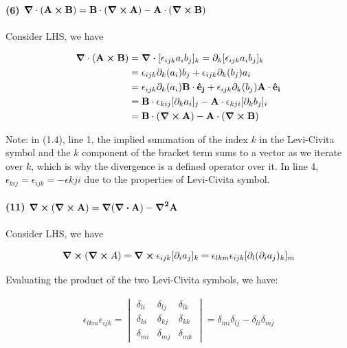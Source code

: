 \documentclass{article}
\numberwithin{equation}{section}
\begin{document}
\paragraph{(6) $\vb{\grad \cdot (A \cross B) = B \cdot (\grad \cross A) - A \cdot (\grad \cross B)} \\$}

Consider LHS, we have 

\begin{equation}
    \begin{split}
        \vb{\grad \cdot (A \cross B)} &= \div \lbrack \epsilon_{ijk} a_i b_j \rbrack_k = \partial_k \lbrack \epsilon_{ijk} a_i b_j \rbrack_k \\
        &= \epsilon_{ijk} \partial_k (a_i) b_j + \epsilon_{ijk} \partial_k (b_j) a_i \\
        &= \epsilon_{ijk} \partial_k (a_i) \vb{B \cdot \hat{e}_j} + \epsilon_{ijk} \partial_k (b_j) \vb{A \cdot \hat{e}_i} \\
        &= \vb{B} \cdot \epsilon_{kij} \lbrack \partial_k a_i \rbrack_j - \vb{A} \cdot \epsilon_{kji} \lbrack \partial_k b_j \rbrack_i \\
        &= \vb{B \cdot (\curl A) - A \cdot (\curl B)}
    \end{split}
\end{equation}

Note: in (1.4), line 1, the implied summation of the index $k$ in the Levi-Civita symbol and the $k$ component of the bracket term sums to a vector as we iterate over $k$, which is why the divergence is a defined operator over it. In line 4, $\epsilon_{kij} = \epsilon_{ijk} = - \epsilon{kji}$ due to the properties of Levi-Civita symbol.

\paragraph{(11) $\vb{\curl (\curl A) = \grad (\div A) - \grad^2 A}$}

Consider LHS, we have

\begin{equation}
        \curl (\curl A) = \curl \epsilon_{ijk} \lbrack \partial_i a_j \rbrack_k = \epsilon_{lkm} \epsilon_{ijk}  \lbrack \partial_l (\partial_i a_j)_k \rbrack_m  
\end{equation}

Evaluating the product of the two Levi-Civita symbols, we have:

\begin{equation}
    \begin{split}
        \epsilon_{lkm} \epsilon_{ijk} = \begin{vmatrix}
            \delta_{li} & \delta_{lj} & \delta_{lk} \\ \delta_{ki} & \delta_{kj} & \delta_{kk} \\ \delta_{mi} & \delta_{mj} & \delta_{mk} 
        \end{vmatrix} = \delta_{mi} \delta_{lj} - \delta_{li} \delta_{mj} 
    \end{split}
\end{equation}
\end{document}
